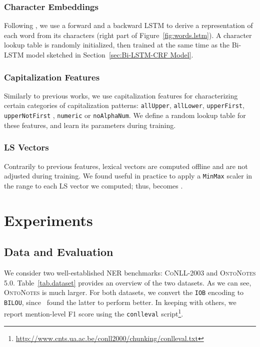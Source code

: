 \documentclass[11pt]{article}
\newcommand{\conll}{\textsc{CoNLL}}
\newcommand{\onto}{\textsc{OntoNotes}}
\newcommand{\lr}{\textsc{LS}}
\begin{document}
	
	\subsubsection{Character Embeddings}
	\label{sec:Chars}
	
	
	Following  \cite{lample2016neural}, we use a forward and a backward LSTM to derive a representation of each word from its characters (right part of Figure~\ref{fig:words.lstm}). A character lookup table is randomly initialized, then trained at the same time as the Bi-LSTM model sketched  in Section~\ref{sec:Bi-LSTM-CRF Model}.
	
	\subsubsection{Capitalization Features}
	\label{sec:Caps}
	
	Similarly to previous works, we use capitalization features for characterizing certain categories of capitalization patterns: \texttt{allUpper}, \texttt{allLower}, \texttt{upperFirst}, \texttt{upperNotFirst} , \texttt{numeric} or \texttt{noAlphaNum}. We define a random lookup table for these features, and learn its parameters during training.
	
	\subsubsection{\lr{} Vectors}
	
	Contrarily to previous features, lexical vectors are computed offline and are not adjusted during training. 
	We found useful in practice to apply a \texttt{MinMax} scaler in the range  to each \lr{} vector we computed; thus,   becomes .
	
\section{Experiments}
	\label{sec:Experiments}

	\subsection{Data and Evaluation}
	\label{sec:Datasets}
	
	We consider two well-established NER benchmarks: \conll{-2003} and \onto{ 5.0}. Table~\ref{tab.dataset} provides an overview of the two datasets. As we can see, \onto{} is much larger. 
	For both datasets, we convert the \texttt{IOB} encoding to \texttt{BILOU}, since~ found the latter to perform better. In keeping with others, we report mention-level F1 score using the \texttt{conlleval} script\footnote{\url{http://www.cnts.ua.ac.be/conll2000/chunking/conlleval.txt}}.
	
\end{document}
